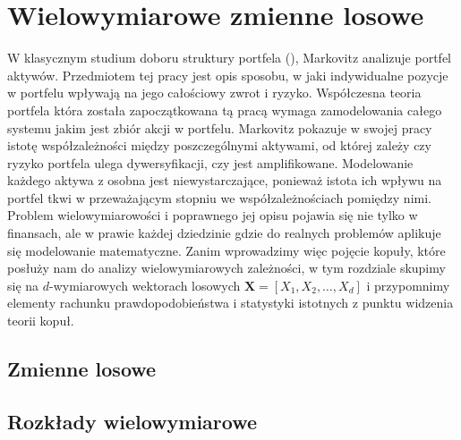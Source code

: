 \chapter{Wielowymiarowe zmienne losowe}
W klasycznym studium doboru struktury portfela (\cite{Markovitz_MPT}), Markovitz analizuje portfel aktywów. Przedmiotem tej pracy jest opis sposobu, w jaki indywidualne pozycje w portfelu wpływają na jego całościowy zwrot i ryzyko. Współczesna teoria portfela która została zapoczątkowana tą pracą wymaga zamodelowania całego systemu jakim jest zbiór akcji w portfelu. Markovitz pokazuje w swojej pracy istotę współzależności między poszczególnymi aktywami, od której zależy czy ryzyko portfela ulega dywersyfikacji, czy jest amplifikowane. Modelowanie każdego aktywa z osobna jest niewystarczające, ponieważ istota ich wpływu na portfel tkwi w przeważającym stopniu we współzależnościach pomiędzy nimi.\\
Problem wielowymiarowości i poprawnego jej opisu pojawia się nie tylko w finansach, ale w prawie każdej dziedzinie gdzie do realnych problemów aplikuje się modelowanie matematyczne. Zanim wprowadzimy więc pojęcie kopuły, które posłuży nam do analizy wielowymiarowych zależności, w tym rozdziale skupimy się na $d$-wymiarowych wektorach losowych $\mathbf{X} = [X_1, X_2, \dots, X_d]$ i przypomnimy elementy rachunku prawdopodobieństwa i statystyki istotnych z punktu widzenia teorii kopuł.\\

\section{Zmienne losowe}
\label{sec:rozklady_laczne}


\section{Rozkłady wielowymiarowe}
\label{sec:rozklady_wielowymiarowe}


\mgrclosechapter